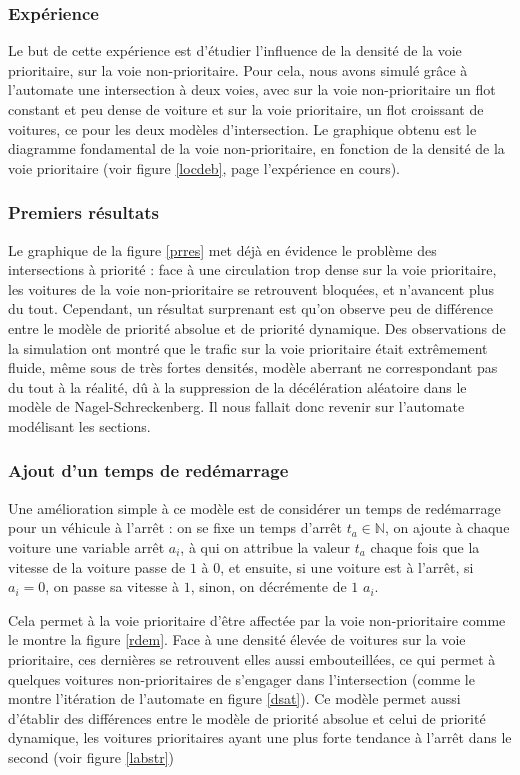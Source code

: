 \documentclass[11pt]{article}
\begin{document}
		\subsubsection{Expérience}
Le but de cette expérience est d'étudier l'influence de la densité de la voie prioritaire, sur la voie non-prioritaire. Pour cela, nous avons simulé grâce à l'automate une intersection à deux voies, avec sur la voie non-prioritaire un flot constant et peu dense de voiture et sur la voie prioritaire, un flot croissant de voitures, ce pour les deux modèles d'intersection. Le graphique obtenu est le diagramme fondamental de la voie non-prioritaire, en fonction de la densité de la voie prioritaire (voir figure \ref{locdeb}, page \pageref{locdeb} l'expérience en cours).
		
		\subsubsection{Premiers résultats}

Le graphique de la figure \ref{prres} met déjà en évidence le problème des intersections à priorité : face à une circulation trop dense sur la voie prioritaire, les voitures de la voie non-prioritaire se retrouvent bloquées, et n'avancent plus du tout. Cependant, un résultat surprenant est qu'on observe peu de différence entre le modèle de priorité absolue et de priorité dynamique. Des observations de la simulation ont montré que le trafic sur la voie prioritaire était extrêmement fluide, même sous de très fortes densités, modèle aberrant ne correspondant pas du tout à la réalité, dû à la suppression de la décélération aléatoire dans le modèle de Nagel-Schreckenberg. Il nous fallait donc revenir sur l'automate modélisant les sections.

	\subsubsection{Ajout d'un temps de redémarrage}
Une amélioration simple à ce modèle est de considérer un temps de redémarrage pour un véhicule à l'arrêt : on se fixe un temps d'arrêt $t_{a} \in \mathbb{N}$, on ajoute à chaque voiture une variable arrêt $a_i$, à qui on attribue la valeur $t_{a}$ chaque fois que la vitesse de la voiture passe de $1$ à $0$, et ensuite, si une voiture est à l'arrêt, si $a_i = 0$, on passe sa vitesse à $1$, sinon, on décrémente de $1$ $a_i$.\par Cela permet à la voie prioritaire d'être affectée par la voie non-prioritaire comme le montre la figure \ref{rdem}. Face à une densité élevée de voitures sur la voie prioritaire, ces dernières se retrouvent elles aussi embouteillées, ce qui permet à quelques voitures non-prioritaires de s'engager dans l'intersection (comme le montre l'itération de l'automate en figure \ref{dsat}). Ce modèle permet aussi d'établir des différences entre le modèle de priorité absolue et celui de priorité dynamique, les voitures prioritaires ayant une plus forte tendance à l'arrêt dans le second (voir figure \ref{labstr})
\end{document}
